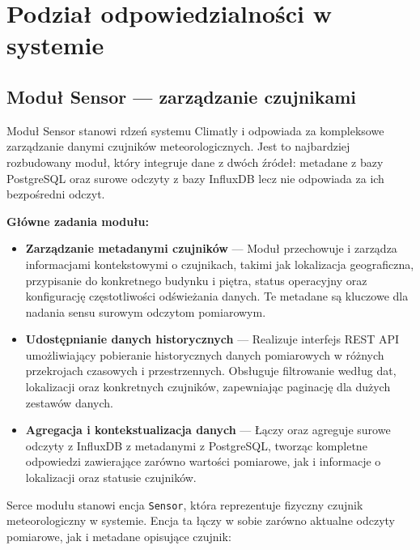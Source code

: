 \documentclass[a4paper,12pt,openany]{book}
\begin{document}
\section{Podział odpowiedzialności w systemie}

\subsection{Moduł Sensor --- zarządzanie czujnikami}
Moduł Sensor stanowi rdzeń systemu Climatly i odpowiada za kompleksowe zarządzanie danymi czujników meteorologicznych. Jest to najbardziej rozbudowany moduł, który integruje dane z dwóch źródeł: metadane z bazy PostgreSQL oraz surowe odczyty z bazy InfluxDB lecz nie odpowiada za ich bezpośredni odczyt.

\textbf{Główne zadania modułu:}
\begin{itemize}[itemsep=2pt,topsep=4pt,parsep=0pt]
\item \textbf{Zarządzanie metadanymi czujników} --- Moduł przechowuje i zarządza informacjami kontekstowymi o czujnikach, takimi jak lokalizacja geograficzna, przypisanie do konkretnego budynku i piętra, status operacyjny oraz konfigurację częstotliwości odświeżania danych. Te metadane są kluczowe dla nadania sensu surowym odczytom pomiarowym.

\item \textbf{Udostępnianie danych historycznych} --- Realizuje interfejs REST API umożliwiający pobieranie historycznych danych pomiarowych w różnych przekrojach czasowych i przestrzennych. Obsługuje filtrowanie według dat, lokalizacji oraz konkretnych czujników, zapewniając paginację dla dużych zestawów danych.

\item \textbf{Agregacja i kontekstualizacja danych} --- Łączy oraz agreguje surowe odczyty z InfluxDB z metadanymi z PostgreSQL, tworząc kompletne odpowiedzi zawierające zarówno wartości pomiarowe, jak i informacje o lokalizacji oraz statusie czujników.
\end{itemize}


Serce modułu stanowi encja \texttt{Sensor}, która reprezentuje fizyczny czujnik meteorologiczny w systemie. Encja ta łączy w sobie zarówno aktualne odczyty pomiarowe, jak i metadane opisujące czujnik:
\end{document}
